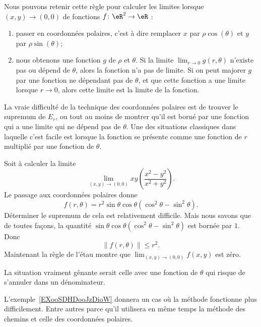 Nous pouvons retenir cette règle pour calculer les limites lorsque $(x,y)\to(0,0)$ de fonctions $f\colon \eR^2\to \eR$ :
\begin{enumerate}
	\item
		passer en coordonnées polaires, c'est à dire remplacer $x$ par $\rho\cos(\theta)$ et $y$ par $\rho\sin(\theta)$;
	\item
		nous obtenons une fonction $g$ de $\rho$ et $\theta$. Si la limite $\lim_{r\to 0} g(r,\theta)$ n'existe pas ou dépend de $\theta$, alors la fonction n'a pas de limite. Si on peut majorer $g$ par une fonction ne dépendant pas de $\theta$, et que cette fonction a une limite lorsque $r\to 0$, alors cette limite est la limite de la fonction.
\end{enumerate}

La vraie difficulté de la technique des coordonnées polaires est de trouver le supremum de $E_r$, ou tout au moins de montrer qu'il est borné par une fonction qui a une limite qui ne dépend pas de $\theta$. Une des situations classiques dans laquelle c'est facile est lorsque la fonction se présente comme une fonction de $r$ multiplié par une fonction de $\theta$.

\begin{example}		\label{Exemplexyxsqysq}
	Soit à calculer la limite
	\begin{equation}
		\lim_{(x,y)\to(0,0)}xy\left( \frac{ x^2-y^2 }{ x^2+y^2 }\right).
	\end{equation}
	Le passage aux coordonnées polaires donne
	\begin{equation}
		f(r,\theta)=r^2\sin\theta\cos\theta(\cos^2\theta-\sin^2\theta).
	\end{equation}
	Déterminer le supremum de cela est relativement difficile. Mais nous savons que de toutes façons, la quantité $\sin\theta\cos\theta(\cos^2\theta-\sin^2\theta)$ est bornée par $1$. Donc
	\begin{equation}
		\| f(r,\theta) \|\leq r^2.
	\end{equation}
	Maintenant la règle de l'étau montre que $\lim_{(x,y)\to(0,0)}f(x,y)$ est zéro.

	La situation vraiment gênante serait celle avec une fonction de $\theta$ qui risque de s'annuler dans un dénominateur.
\end{example}

L'exemple~\ref{EXooSDHDooJzDioW} donnera un cas où la méthode fonctionne plus difficilement. Entre autres parce qu'il utilisera en même temps la méthode des chemins et celle des coordonnées polaires.

